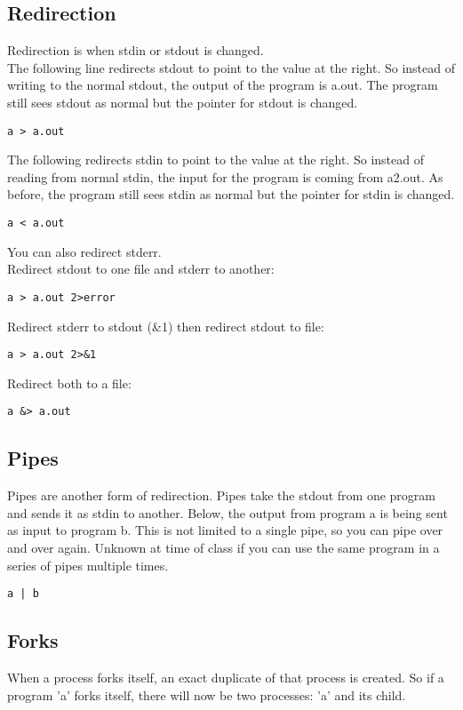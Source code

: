 \documentclass{report}
\begin{document}
\subsection*{Redirection}
Redirection is when stdin or stdout is changed.\\

The following line redirects stdout to point to the value at the right. So instead of writing to the normal stdout, the output of the program is a.out. The program still sees stdout as normal but the pointer for stdout is changed.
\begin{verbatim}
a > a.out
\end{verbatim}

The following redirects stdin to point to the value at the right. So instead of reading from normal stdin, the input for the program is coming from a2.out. As before, the program still sees stdin as normal but the pointer for stdin is changed.
\begin{verbatim}
a < a.out
\end{verbatim}

You can also redirect stderr.\\
Redirect stdout to one file and stderr to another:
\begin{verbatim}
a > a.out 2>error
\end{verbatim}
Redirect stderr to stdout (\&1) then redirect stdout to file:
\begin{verbatim}
a > a.out 2>&1
\end{verbatim}
Redirect both to a file:
\begin{verbatim}
a &> a.out
\end{verbatim}

\subsection*{Pipes}
Pipes are another form of redirection. Pipes take the stdout from one program and sends it as stdin to another. Below, the output from program a is being sent as input to program b. This is not limited to a single pipe, so you can pipe over and over again. Unknown at time of class if you can use the same program in a series of pipes multiple times.
\begin{verbatim}
a | b
\end{verbatim}

\subsection*{Forks}
When a process forks itself, an exact duplicate of that process is created. So if a program 'a' forks itself, there will now be two processes: 'a' and its child.\\
\end{document}

